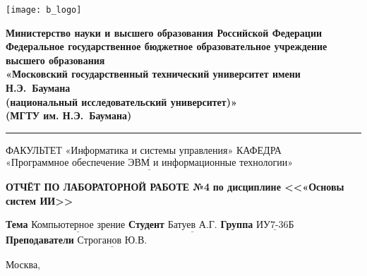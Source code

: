 \thispagestyle{empty}

\noindent \begin{minipage}{0.15\textwidth}
	\texttt{[image: b\_logo]}
\end{minipage}
\noindent\begin{minipage}{0.85\textwidth}\centering
	\textbf{Министерство науки и высшего образования Российской Федерации}\\
	\textbf{Федеральное государственное бюджетное образовательное учреждение высшего образования}\\
	\textbf{«Московский государственный технический университет имени Н.Э.~Баумана}\\
	\textbf{(национальный исследовательский университет)»}\\
	\textbf{(МГТУ им. Н.Э.~Баумана)}
\end{minipage}

\noindent\rule{\linewidth}{3pt}
\newline\newline
\noindent ФАКУЛЬТЕТ $\underline{\text{«Информатика и системы управления»}}$ \newline\newline
\noindent КАФЕДРА $\underline{\text{«Программное обеспечение ЭВМ и информационные технологии»}}$

\vspace{1cm}

\begin{center}
	\noindent\begin{minipage}{1.3\textwidth}\centering
		\Large\textbf{ОТЧЁТ ПО ЛАБОРАТОРНОЙ РАБОТЕ №4}\newline
		\textbf{по дисциплине <<«Основы систем ИИ>>}\newline\newline
	\end{minipage}
\end{center}

\noindent\textbf{Тема} $\underline{\text{Компьютерное зрение}}$\newline\newline
\noindent\textbf{Студент} $\underline{\text{Батуев А.Г.}}$\newline\newline
\noindent\textbf{Группа} $\underline{\text{ИУ7-36Б}}$\newline\newline
\noindent\textbf{Преподаватели} $\underline{\text{Строганов Ю.В.}}$\newline

\begin{center}
	\vfill
	Москва,~\the\year
\end{center}
\clearpage
